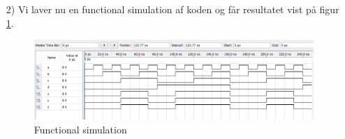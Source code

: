 \begin{enumerate}
	\item[2)]
	Vi laver nu en functional simulation af koden og får resultatet vist på figur \ref{fig:comVHDLFunSim}. 
		\begin{figure}[h]
			\centering
			\includegraphics[scale=0.6]{pictures/Oevelse4/combinational_VHDL_Func_sim.jpg}
			\caption{Functional simulation}
			\label{fig:comVHDLFunSim}
		\end{figure}
\end{enumerate}